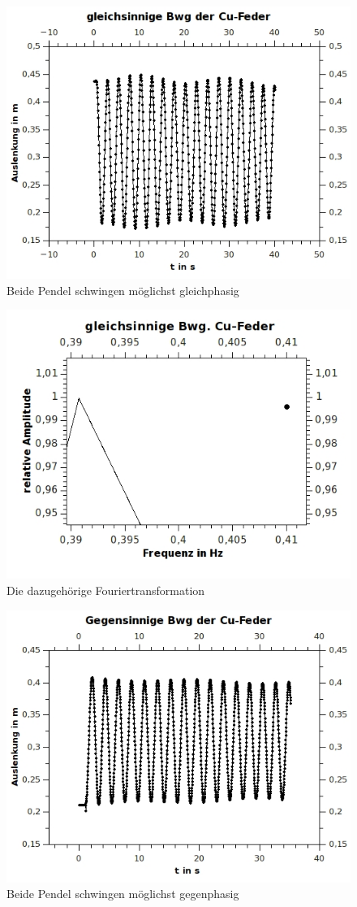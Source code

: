 \begin{figure}[h!]
\centering
\includegraphics[width=0.6\linewidth]{../Messungen/graphen/gleich-Bwg-Cu}
\caption{Beide Pendel schwingen möglichst gleichphasig}
\label{fig:gleich-Bwg-Cu}
\end{figure}

\begin{figure}[h!]
\centering
\includegraphics[width=0.55\linewidth]{../Messungen/graphen/gleich-Bwg-Cu-FFT}
\caption{Die dazugehörige Fouriertransformation}
\label{fig:gleich-Bwg-Cu-FFT}
\end{figure}

\clearpage

\begin{figure}[h!]
\centering
\includegraphics[width=0.55\linewidth]{../Messungen/graphen/gg-Bwg-Cu}
\caption{Beide Pendel schwingen möglichst gegenphasig}
\label{fig:gg-Bwg-Cu}
\end{figure}

